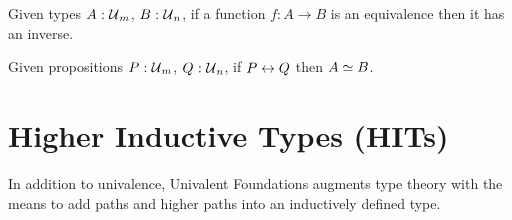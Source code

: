 \begin{prop}
  Given types $A\hspace{0.1mm}:\hspace{0.1mm}\mathcal{U}{}_m$, $B\hspace{0.1mm}:\hspace{0.1mm}\mathcal{U}{}_n$, if a function $f : A \rightarrow B$
  is an equivalence then it has an inverse.
\end{prop}

\begin{prop}\label{prop:iff-equiv}
  Given propositions $P\hspace{0.1mm}:\hspace{0.1mm}\mathcal{U}{}_m$, $Q\hspace{0.1mm}:\hspace{0.1mm}\mathcal{U}{}_n$, if $P \leftrightarrow Q$
  then $A \simeq B$.
\end{prop}

\section{Higher Inductive Types (HITs)}

In addition to univalence, Univalent Foundations augments type theory with the means to
add paths and higher paths into an inductively defined type.
